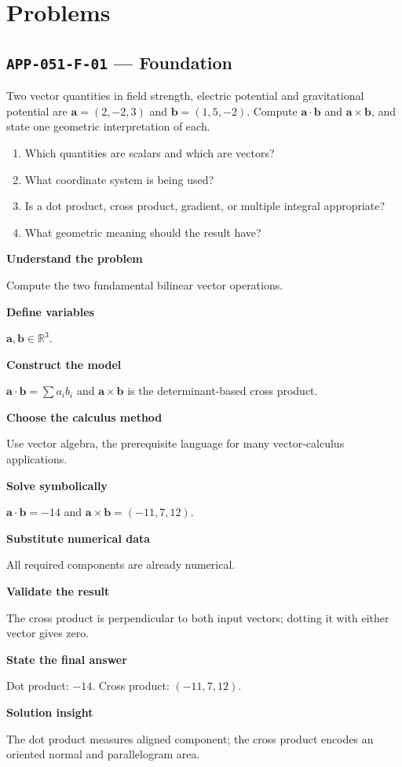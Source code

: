 \documentclass[11pt]{book}
\newcommand{\pid}[1]{\texttt{#1}}
\begin{document}
\section*{Problems}
\subsection*{\pid{APP-051-F-01} — Foundation}
\begin{problembox}
Two vector quantities in field strength, electric potential and gravitational potential are $\mathbf a=(2,-2,3)$ and $\mathbf b=(1,5,-2)$. Compute $\mathbf a\cdot\mathbf b$ and $\mathbf a\times\mathbf b$, and state one geometric interpretation of each.
\end{problembox}
\begin{promptbox}\begin{enumerate}
\item Which quantities are scalars and which are vectors?
\item What coordinate system is being used?
\item Is a dot product, cross product, gradient, or multiple integral appropriate?
\item What geometric meaning should the result have?
\end{enumerate}\end{promptbox}
\begin{solutionbox}
\textbf{Understand the problem}\par Compute the two fundamental bilinear vector operations.\par\medskip
\textbf{Define variables}\par $\mathbf a,\mathbf b\in\mathbb R^3$.\par\medskip
\textbf{Construct the model}\par $\mathbf a\cdot\mathbf b=\sum a_ib_i$ and $\mathbf a\times\mathbf b$ is the determinant-based cross product.\par\medskip
\textbf{Choose the calculus method}\par Use vector algebra, the prerequisite language for many vector-calculus applications.\par\medskip
\textbf{Solve symbolically}\par $\mathbf a\cdot\mathbf b=-14$ and $\mathbf a\times\mathbf b=(-11,7,12)$.\par\medskip
\textbf{Substitute numerical data}\par All required components are already numerical.\par\medskip
\textbf{Validate the result}\par The cross product is perpendicular to both input vectors; dotting it with either vector gives zero.\par\medskip
\textbf{State the final answer}\par Dot product: $-14$. Cross product: $(-11,7,12)$.\par\medskip
\textbf{Solution insight}\par The dot product measures aligned component; the cross product encodes an oriented normal and parallelogram area.\par\medskip
\end{solutionbox}
\end{document}

